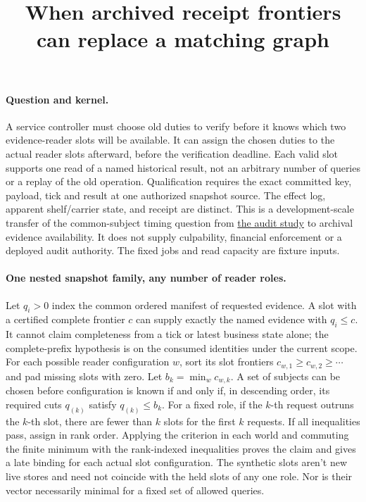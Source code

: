 \documentclass[11pt]{article}
\title{When archived receipt frontiers can replace a matching graph}
\author{}\date{}
\begin{document}
\maketitle

\paragraph{Question and kernel.}
A service controller must choose old duties to verify before it knows
which two evidence-reader slots will be available. It can assign
the chosen duties to the actual reader slots afterward, before the
verification deadline. Each valid slot supports one read of a named
historical result, not an arbitrary number of queries or a replay of
the old operation. Qualification requires the exact committed key,
payload, tick and result at one authorized snapshot source. The
effect log, apparent shelf/carrier state, and receipt are distinct.
This is a development-scale transfer of the common-subject
timing question from
\href{https://github.com/eternal-november/eos-research-programmes/pull/691}
{the audit study} to archival evidence availability. It does not
supply culpability, financial enforcement or a deployed audit authority.
The fixed jobs and read capacity are fixture inputs.

\paragraph{One nested snapshot family, any number of reader roles.}
Let \(q_i>0\) index the common ordered manifest of requested evidence.
A slot with a certified complete frontier \(c\) can supply exactly
the named evidence with \(q_i\le c\). It cannot claim completeness
from a tick or latest business state alone; the complete-prefix
hypothesis is on the consumed identities under the current scope.
For each possible reader configuration \(w\), sort its slot frontiers
\(c_{w,1}\ge c_{w,2}\ge\cdots\) and pad missing slots with zero.
Let \(b_k=\min_w c_{w,k}\). A set of subjects can be chosen before
configuration is known if and only if, in descending order,
its required cuts \(q_{(k)}\) satisfy \(q_{(k)}\le b_k\).
For a fixed role, if the \(k\)-th request outruns the \(k\)-th
slot, there are fewer than \(k\) slots for the first \(k\) requests.
If all inequalities pass, assign in rank order. Applying the
criterion in each world and commuting the finite minimum with the
rank-indexed inequalities proves the claim and gives a late binding
for each actual slot configuration. The synthetic slots aren't new
live stores and need not coincide with the held slots of any one
role. Nor is their vector necessarily minimal for a fixed set of
allowed queries.
\end{document}
